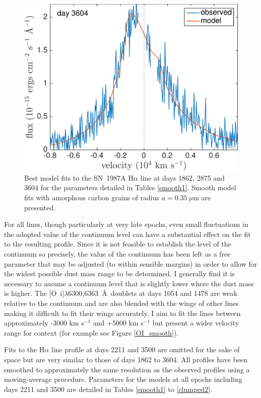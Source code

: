 \begin{figure}
\includegraphics[trim =0 0 0 -30,clip=true,scale=0.4]{chapters/chapter5/images/smooth/best_fit/d3604Ha.pdf}
\caption{Best model fits to the SN~1987A H$\alpha$ line at days 1862, 2875 and 
3604 for the parameters detailed in Tables \ref{smooth1}.  Smooth model fits with amorphous carbon grains of radius $a=0.35~\mu$m are presented.}
\label{smooth_late}
\end{figure}



For all lines, though particularly at very late epochs, even small 
fluctuations in the adopted value of the continuum level can have a 
substantial effect on the fit to the resulting profile.  Since it is not 
feasible to establish the level of the continuum so precisely, the value 
of the continuum has been left as a free parameter that may be adjusted 
(to within sensible margins) in order to allow for the widest possible 
dust mass range to be determined.  I generally find it is necessary to 
assume a continuum level that is slightly lower where the dust mass is 
higher.  The [O~{\sc i}]$\lambda$6300,6363~\AA\ doublets at days 1054 and 
1478 are weak relative to the continuum and are also blended with the 
wings of other lines making it difficult to fit their wings accurately.  
I aim to fit the lines between approximately -3000 km s$^{-1}$ and +5000 
km s$^{-1}$ but present a wider velocity range for context (for example 
see Figure \ref{OI_smooth}).


Fits to the H$\alpha$ line profile at days 2211 and 3500 are omitted for 
the sake of space but are very similar to those of days 1862 to 3604.  
All profiles have been smoothed to approximately the same resolution as 
the observed profiles using a moving-average procedure.  Parameters for 
the models at all epochs including days 2211 and 3500 are detailed in 
Tables \ref{smooth1} to \ref{clumped2}.


